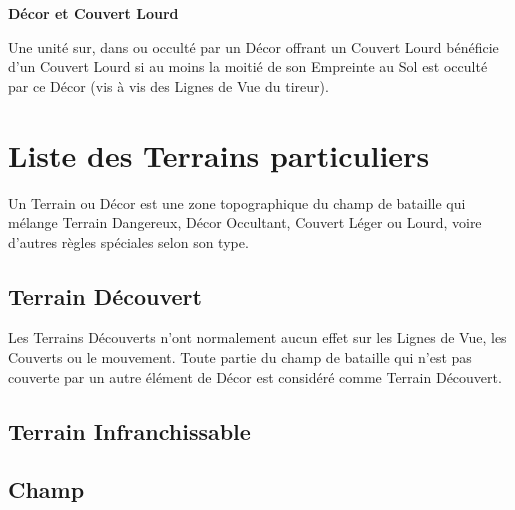 \noindent\textbf{Décor et Couvert Lourd}

Une unité sur, dans ou occulté par un Décor offrant un Couvert Lourd bénéficie d'un Couvert Lourd si au moins la moitié de son Empreinte au Sol est occulté par ce Décor (vis à vis des Lignes de Vue du tireur). 

\newpage
\section{Liste des Terrains particuliers}

Un Terrain ou Décor est une zone topographique du champ de bataille qui mélange Terrain Dangereux, Décor Occultant, Couvert Léger ou Lourd, voire d'autres règles spéciales selon son type.

\subsection{Terrain Découvert}

Les Terrains Découverts n'ont normalement aucun effet sur les Lignes de Vue, les Couverts ou le mouvement. Toute partie du champ de bataille qui n'est pas couverte par un autre élément de Décor est considéré comme Terrain Découvert.

\subsection{Terrain Infranchissable}


\subsection{Champ}

